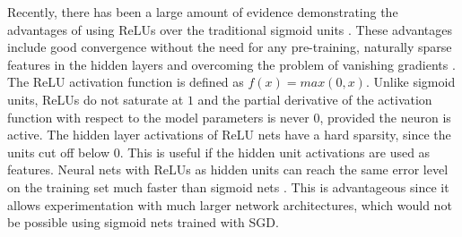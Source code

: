 \documentclass{article}
\begin{document}

Recently, there has been a large amount of evidence demonstrating the advantages of using ReLUs over the traditional sigmoid units \cite{nair2010rectified,glorot2011deep}. These advantages include good convergence without the need for any pre-training, naturally sparse features in the hidden layers \cite{glorot2011deep} and overcoming the problem of vanishing gradients \cite{glorot2010understanding,bengio1994learning}. The ReLU activation function is defined as $f(x) = max(0,x)$. Unlike sigmoid units, ReLUs do not saturate at $1$ and the partial derivative of the activation function with respect to the model parameters is never $0$, provided the neuron is active. The hidden layer activations of ReLU nets have a hard sparsity, since the units cut off below $0$. This is useful if the hidden unit activations are used as features. Neural nets with ReLUs as hidden units can reach the same error level on the training set much faster than sigmoid nets \cite{krizhevsky2012imagenet}. This is advantageous since it allows experimentation with much larger network architectures, which would not be possible using sigmoid nets trained with SGD. 



\end{document}

